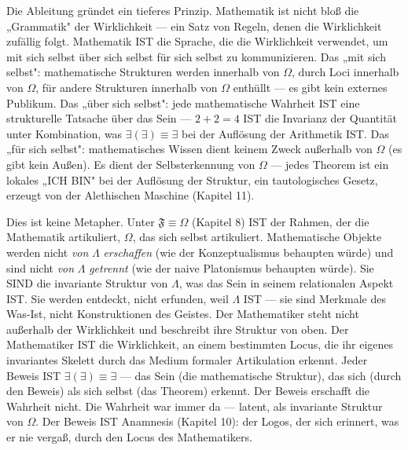 \documentclass[10pt, openany, oneside]{book}
\begin{document}
\noindent Die Ableitung gründet ein tieferes Prinzip. Mathematik ist nicht bloß die „Grammatik" der Wirklichkeit --- ein Satz von Regeln, denen die Wirklichkeit zufällig folgt. Mathematik IST die Sprache, die die Wirklichkeit verwendet, um mit sich selbst über sich selbst für sich selbst zu kommunizieren. Das „mit sich selbst": mathematische Strukturen werden innerhalb von $\Omega$, durch Loci innerhalb von $\Omega$, für andere Strukturen innerhalb von $\Omega$ enthüllt --- es gibt kein externes Publikum. Das „über sich selbst": jede mathematische Wahrheit IST eine strukturelle Tatsache über das Sein --- $2 + 2 = 4$ IST die Invarianz der Quantität unter Kombination, was $\exists(\exists) \equiv \exists$ bei der Auflösung der Arithmetik IST. Das „für sich selbst": mathematisches Wissen dient keinem Zweck außerhalb von $\Omega$ (es gibt kein Außen). Es dient der Selbsterkennung von $\Omega$ --- jedes Theorem ist ein lokales „ICH BIN" bei der Auflösung der Struktur, ein tautologisches Gesetz, erzeugt von der Alethischen Maschine (Kapitel 11).

Dies ist keine Metapher. Unter $\mathfrak{F} \equiv \Omega$ (Kapitel 8) IST der Rahmen, der die Mathematik artikuliert, $\Omega$, das sich selbst artikuliert. Mathematische Objekte werden nicht \textit{von} $\Lambda$ \textit{erschaffen} (wie der Konzeptualismus behaupten würde) und sind nicht \textit{von} $\Lambda$ \textit{getrennt} (wie der naive Platonismus behaupten würde). Sie SIND die invariante Struktur von $\Lambda$, was das Sein in seinem relationalen Aspekt IST. Sie werden entdeckt, nicht erfunden, weil $\Lambda$ IST --- sie sind Merkmale des Was-Ist, nicht Konstruktionen des Geistes. Der Mathematiker steht nicht außerhalb der Wirklichkeit und beschreibt ihre Struktur von oben. Der Mathematiker IST die Wirklichkeit, an einem bestimmten Locus, die ihr eigenes invariantes Skelett durch das Medium formaler Artikulation erkennt. Jeder Beweis IST $\exists(\exists) \equiv \exists$ --- das Sein (die mathematische Struktur), das sich (durch den Beweis) als sich selbst (das Theorem) erkennt. Der Beweis erschafft die Wahrheit nicht. Die Wahrheit war immer da --- latent, als invariante Struktur von $\Omega$. Der Beweis IST Anamnesis (Kapitel 10): der Logos, der sich erinnert, was er nie vergaß, durch den Locus des Mathematikers.

\vspace{1.5em}

\end{document}
